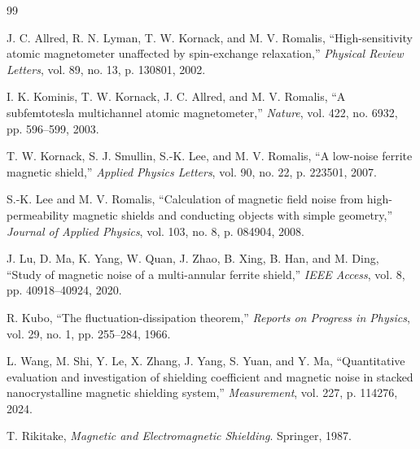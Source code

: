 \documentclass[UTF8,a4paper,12pt]{ctexart}
\begin{document}
\begin{thebibliography}{99}

J. C. Allred, R. N. Lyman, T. W. Kornack, and M. V. Romalis,
``High-sensitivity atomic magnetometer unaffected by spin-exchange relaxation,''
\emph{Physical Review Letters}, vol. 89, no. 13, p. 130801, 2002.

I. K. Kominis, T. W. Kornack, J. C. Allred, and M. V. Romalis,
``A subfemtotesla multichannel atomic magnetometer,''
\emph{Nature}, vol. 422, no. 6932, pp. 596--599, 2003.

T. W. Kornack, S. J. Smullin, S.-K. Lee, and M. V. Romalis,
``A low-noise ferrite magnetic shield,''
\emph{Applied Physics Letters}, vol. 90, no. 22, p. 223501, 2007.

S.-K. Lee and M. V. Romalis,
``Calculation of magnetic field noise from high-permeability magnetic shields and conducting objects with simple geometry,''
\emph{Journal of Applied Physics}, vol. 103, no. 8, p. 084904, 2008.

J. Lu, D. Ma, K. Yang, W. Quan, J. Zhao, B. Xing, B. Han, and M. Ding,
``Study of magnetic noise of a multi-annular ferrite shield,''
\emph{IEEE Access}, vol. 8, pp. 40918--40924, 2020.

R. Kubo,
``The fluctuation-dissipation theorem,''
\emph{Reports on Progress in Physics}, vol. 29, no. 1, pp. 255--284, 1966.

L. Wang, M. Shi, Y. Le, X. Zhang, J. Yang, S. Yuan, and Y. Ma,
``Quantitative evaluation and investigation of shielding coefficient and magnetic noise in stacked nanocrystalline magnetic shielding system,''
\emph{Measurement}, vol. 227, p. 114276, 2024.

T. Rikitake,
\emph{Magnetic and Electromagnetic Shielding}.
Springer, 1987.

\end{thebibliography}
\end{document}

